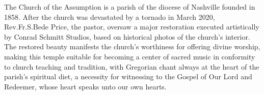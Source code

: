 \documentclass[12pt]{book}
\begin{document}






%
%
%  
%
%
%







\newpage

\thispagestyle{empty}


The Church of the Assumption is a parish of the diocese of Nashville founded in 1858. 
After the church was devastated by a tornado in March 2020, Rev.\@ Fr.\@ S.\@ Bede Price, the pastor, oversaw a major restoration executed artistically by Conrad Schmitt Studios, based on historical photos of the church's interior. The restored beauty manifests the church's worthiness
for offering divine worship, making this temple suitable for becoming a center of sacred music in conformity to church teaching and tradition,
with Gregorian chant always at the heart of the parish's spiritual diet, a necessity for witnessing to the Gospel of Our Lord and Redeemer, whose heart speaks unto our own hearts.
\end{document}

